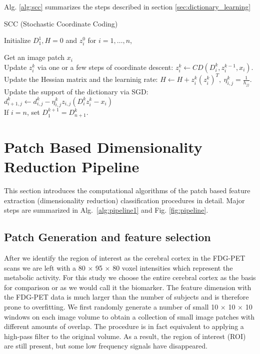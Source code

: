 Alg. \ref{alg:scc} summarizes the steps described in section \ref{sec:dictionary_learning}

\begin{algorithm}
	
	\caption{SCC (Stochastic Coordinate Coding)}\label{alg:scc}
	
	
	Initialize $ D_1^1, H = 0 $ and $ z_i^0 $ for $ i = 1,\dots,n $,
	
	{
		{Get an image patch $ x_i $\\
			Update $ z_i^k $ via one or a few steps of coordinate descent: \hspace{1.5cm}$ z_i^k \gets CD(D_i^k,z^{k-1}_i,x_i)$.\\
			Update the Hessian matrix and the learninig rate:
			\hspace{1.5cm}$ H \gets H + z^k_i(z^k_i)^T, ~\eta^k_{i,j} = \frac{1}{h_{jj}} $.\\
			Update the support of the dictionary via SGD:
			\hspace{1.5cm}$ d^k_{i+1,j} \gets d^k_{i,j} - \eta^k_{i,j}z_{i,j}(D_i^kz^k_i - x_i) $\\
			If $ i = n $, set $ D_1^{k+1} = D^k_{n+1} $.
		}
	}
	
\end{algorithm}

\pagebreak
\section{Patch Based Dimensionality Reduction Pipeline}
\label{sec:dimension_reduction}

This section introduces the computational algorithms of the patch based feature extraction (dimensionality reduction) classification procedures in detail. Major steps are summarized in Alg.~\ref{alg:pipeline1} and Fig. \ref{fig:pipeline}. 

\subsection{Patch Generation and feature selection}
\label{subsec:patch_generation}
After we identify the region of interest as the cerebral cortex in the FDG-PET scans we are left with a 80 $ \times $ 95 $ \times $ 80 voxel intensities which represent the metabolic activity. For this study we choose the entire cerebral cortex as the basis for comparison or as we would call it the biomarker. The feature dimension with the FDG-PET data is much larger than the number of subjects and is therefore prone to overfitting. We first randomly generate a number of small 10 $ \times $ 10 $ \times $ 10 windows on each image volume to obtain a collection of small image patches with different amounts of overlap. The procedure is in fact equivalent to applying a high-pass filter to the original volume. As a result, the region of interest (ROI) are still present, but some low frequency signals have disappeared. 

